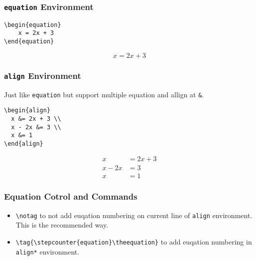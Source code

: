 \documentclass{beamer}
\begin{document}
\begin{frame}[fragile]
  \frametitle{\texttt{equation} Environment}

  \begin{verbatim}
\begin{equation}
    x = 2x + 3
\end{equation}
  \end{verbatim}

  \begin{equation}
      x = 2x + 3
  \end{equation}
\end{frame}

\begin{frame}[fragile]
  \frametitle{\texttt{align} Environment}

  Just like \texttt{equation} but support multiple equation and allign at \verb|&|.
  \begin{verbatim}
\begin{align}
  x &= 2x + 3 \\
  x - 2x &= 3 \\
  x &= 1
\end{align}
    \end{verbatim}

  \begin{align}
    x &= 2x + 3 \\
    x - 2x &= 3 \\
    x &= 1
  \end{align}
\end{frame}


\begin{frame}[fragile]
  \frametitle{Equation Cotrol and Commands}
  \begin{itemize}
    \item \verb|\notag| to not add euqation numbering on current line of \texttt{align} environment. This is the recommended way.
    \item \verb|\tag{\stepcounter{equation}\theequation}| to add euqation numbering in \texttt{align*} environment.
  \end{itemize}
\end{frame}
\end{document}
